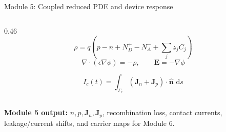 \documentclass[aspectratio=169,9pt]{beamer}
\newcommand{\Evec}{\bm{E}}
\newcommand{\Jn}{\bm{J}_n}
\newcommand{\Jp}{\bm{J}_p}
\newcommand{\dd}{\,\mathrm{d}}
\begin{document}
\begin{frame}{Module 5: Coupled reduced PDE and device response}
\begin{columns}[T,totalwidth=\textwidth]
\begin{column}{0.46\textwidth}
\vspace{0.5mm}
\begin{equation*}
\boxed{\rho=q\left(p-n+N_D^+-N_A^-+\sum_j z_j C_j\right)}
\end{equation*}
\begin{equation*}
\boxed{\nabla\cdot(\epsilon\nabla\phi)=-\rho},
\qquad
\boxed{\Evec=-\nabla\phi}
\end{equation*}

\vspace{0.5mm}
\begin{equation*}
\boxed{I_c(t)=\int_{\Gamma_c}(\Jn+\Jp)\cdot\hat{\bm{n}}\,\dd s}
\end{equation*}
\end{column}
\end{columns}

\vspace{0.8mm}
\begin{greenbox}
\centering\scriptsize
\textbf{Module 5 output:} \(n,p,\Jn,\Jp\), recombination loss, contact currents, leakage/current shifts, and carrier maps for Module 6.
\end{greenbox}
\end{frame}
\end{document}
